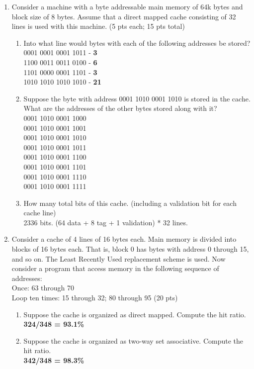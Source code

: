 \documentclass[12pt]{article}
\begin{document}
\begin{enumerate}
    \item Consider a machine with a byte addressable main memory of 64k bytes and block size of 8 bytes. Assume that a direct mapped cache consisting of 32 lines is used with this machine. (5 pts each; 15 pts total)
    \begin{enumerate}
        \item Into what line would bytes with each of the following addresses be stored? \\
            0001 0001 0001 1011 - \textbf{3} \\
            1100 0011 0011 0100 - \textbf{6} \\
            1101 0000 0001 1101 - \textbf{3} \\
            1010 1010 1010 1010 - \textbf{21} \\
        \item Suppose the byte with address 0001 1010 0001 1010 is stored in the cache. What are the addresses of the other bytes stored along with it? \\
            0001 1010 0001 1000 \\
            0001 1010 0001 1001 \\
            0001 1010 0001 1010 \\
            0001 1010 0001 1011 \\
            0001 1010 0001 1100 \\
            0001 1010 0001 1101 \\
            0001 1010 0001 1110 \\
            0001 1010 0001 1111 \\
        \item How many total bits of this cache. (including a validation bit for each cache line) \\
            2336 bits. (64 data + 8 tag + 1 validation) * 32 lines.
    \end{enumerate}

    \item Consider a cache of 4 lines of 16 bytes each. Main memory is divided into blocks of 16 bytes each. That is, block 0 has bytes with address 0 through 15, and so on. The Least Recently Used replacement scheme is used. Now consider a program that access memory in the following sequence of addresses:\\
    Once: 63 through 70 \\
    Loop ten times: 15 through 32; 80 through 95 (20 pts)
    \begin{enumerate}
        \item Suppose the cache is organized as direct mapped. Compute the hit ratio. \\
        \textbf{324/348 = 93.1\%}
        \item Suppose the cache is organized as two-way set associative. Compute the hit ratio. \\
        \textbf{342/348 = 98.3\%}
    \end{enumerate}
    
\end{enumerate}
\end{document}
